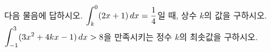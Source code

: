 다음 물음에 답하시오.
 $\displaystyle\int_{k}^{0}(2x+1)\mkern3mu dx=\dfrac{1}{4}$일 때, 상수 $k$의 값을 구하시오.
 $\displaystyle\int_{-1}^{3}(3x^2+4kx-1)\mkern3mu dx>8$을 만족시키는 정수 $k$의 최솟값을 구하시오.
